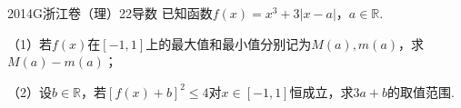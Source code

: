 
\begin{problem}{2014}{G}{浙江卷（理）}{22}{导数}
已知函数$f(x)=x^3+3|x-a|$，$a\in\mathbb{R}$.

（1）若$f(x)$在$[-1,1]$上的最大值和最小值分别记为$M(a),m(a)$，求$M(a)-m(a)$；

（2）设$b\in\mathbb{R}$，若$[f(x)+b]^2\leq4$对$x\in[-1,1]$恒成立，求$3a+b$的取值范围.
\end{problem}
